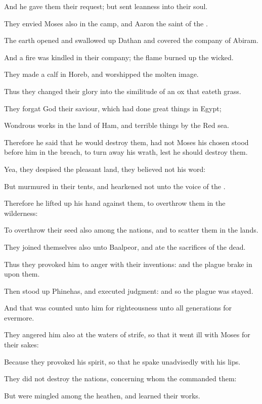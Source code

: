 \Verse And he gave them their request; but sent leanness into their soul.

\Verse They envied Moses also in the camp, and Aaron the saint of the \LORD.

\Verse The earth opened and swallowed up Dathan and covered the company of Abiram.

\Verse And a fire was kindled in their company; the flame burned up the wicked.

\Verse They made a calf in Horeb, and worshipped the molten image.

\Verse Thus they changed their glory into the similitude of an ox that eateth grass.

\Verse They forgat God their saviour, which had done great things in Egypt;

\Verse Wondrous works in the land of Ham, and terrible things by the Red sea.

\Verse Therefore he said that he would destroy them, had not Moses his chosen stood before him in the breach, to turn away his wrath, lest he should destroy them.

\Verse Yea, they despised the pleasant land, they believed not his word:

\Verse But murmured in their tents, and hearkened not unto the voice of the \LORD.

\Verse Therefore he lifted up his hand against them, to overthrow them in the wilderness:

\Verse To overthrow their seed also among the nations, and to scatter them in the lands.

\Verse They joined themselves also unto Baalpeor, and ate the sacrifices of the dead.

\Verse Thus they provoked him to anger with their inventions: and the plague brake in upon them.

\Verse Then stood up Phinehas, and executed judgment: and so the plague was stayed.

\Verse And that was counted unto him for righteousness unto all generations for evermore.

\Verse They angered him also at the waters of strife, so that it went ill with Moses for their sakes:

\Verse Because they provoked his spirit, so that he spake unadvisedly with his lips.

\Verse They did not destroy the nations, concerning whom the \LORD commanded them:

\Verse But were mingled among the heathen, and learned their works.

